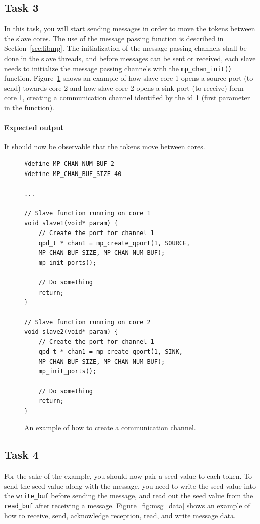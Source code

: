 \documentclass[a4paper,fontsize=10pt,twoside,DIV15,BCOR12mm,headinclude=true,footinclude=false,pagesize,bibtotoc]{scrbook}
\newcommand{\code}[1]{{\texttt{#1}}}
\begin{document}
\subsection{Task 3}
In this task, you will start sending messages in order to move the tokens between the slave cores.
The use of the message passing function is described in Section~\ref{sec:libmp}.
The initialization of the message passing channels shall be done in the slave threads, and before messages can be sent or received, each slave needs to initialize the message passing channels with the \code{mp\_chan\_init()} function.
Figure~\ref{fig:open_channel} shows an example of how slave core 1 opens a source port (to send) towards core 2 and how slave core 2 opens a sink port (to receive) form core 1, creating a communication channel identified by the id 1 (first parameter in the function).

\paragraph*{Expected output}
It should now be observable that the tokens move between cores.

\begin{figure}
\begin{Verbatim}[xleftmargin=1cm,xrightmargin=1cm,frame=single,framesep=3mm]
#define MP_CHAN_NUM_BUF 2
#define MP_CHAN_BUF_SIZE 40

...

// Slave function running on core 1
void slave1(void* param) {
    // Create the port for channel 1
    qpd_t * chan1 = mp_create_qport(1, SOURCE, 
    MP_CHAN_BUF_SIZE, MP_CHAN_NUM_BUF);
    mp_init_ports();

    // Do something
    return;
}

// Slave function running on core 2
void slave2(void* param) {
    // Create the port for channel 1
    qpd_t * chan1 = mp_create_qport(1, SINK, 
    MP_CHAN_BUF_SIZE, MP_CHAN_NUM_BUF);
    mp_init_ports();

    // Do something
    return;
}
\end{Verbatim}
\caption{\label{fig:open_channel}An example of how to create a communication channel.}
\end{figure}


\subsection{Task 4}
For the sake of the example, you should now pair a seed value to each token.
To send the seed value along with the message, you need to write the seed value into
the \code{write\_buf} before sending the message, and read out the seed value from the \code{read\_buf}
after receiving a message.
Figure~\ref{fig:msg_data} shows an example of how to receive, send, acknowledge reception, read, and write message data.
\end{document}

